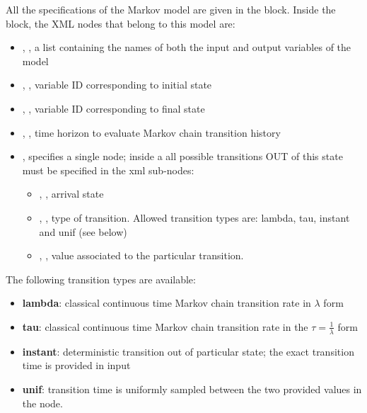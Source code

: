 All the specifications of the Markov model are given in the  block.
Inside the  block, the XML nodes that belong to this model are:
\begin{itemize}
  \item  {}, , a list containing the names of both the input and output variables of the model
  \item  {}, , variable ID corresponding to initial state
  \item  {}, , variable ID corresponding to final state
  \item  {}, , time horizon to evaluate Markov chain transition history
  \item  {}, specifies a single node; inside a  all possible transitions OUT of this state must be specified
                          in the  xml sub-nodes:
	  \begin{itemize}
	  	\item {}, , arrival state
	    \item {}, , type of transition. Allowed transition types are:
      lambda, tau, instant and unif (see below)
	    \item {}, , value associated to the particular transition.
	  \end{itemize}
\end{itemize}

The following transition types are available:
\begin{itemize}
  \item \textbf{lambda}: classical continuous time Markov chain transition rate in $\lambda$ form
  \item \textbf{tau}: classical continuous time Markov chain transition rate in the $\tau = \frac{1}{\lambda}$ form
  \item \textbf{instant}: deterministic transition out of particular state; the exact transition time is provided in input
  \item \textbf{unif}: transition time is uniformly sampled between the two provided values in the  node.
\end{itemize}


